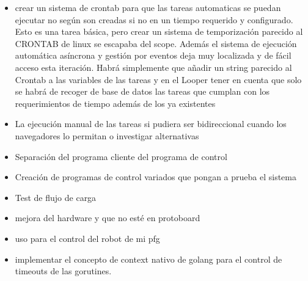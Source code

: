 \begin{itemize}
    \item crear un sistema de crontab para que las tareas automaticas se puedan ejecutar no según son creadas si no en un tiempo requerido y configurado. Esto es una tarea básica, pero crear un sistema de temporización parecido al CRONTAB de linux se escapaba del scope. Además el sistema de ejecución automática asíncrona y gestión por eventos deja muy localizada y de fácil acceso esta iteración. Habrá simplemente que añadir un string parecido al Crontab a las variables de las tareas y en el Looper tener en cuenta que solo se habrá de recoger de base de datos las tareas que cumplan con los requerimientos de tiempo además de los ya existentes
    \item La ejecución manual de las tareas si pudiera ser bidireccional cuando los navegadores lo permitan o investigar alternativas
    \item Separación del programa cliente del programa de control
    \item Creación de programas de control variados que pongan a prueba el sistema
    \item Test de flujo de carga
    \item mejora del hardware y que no esté en protoboard
    \item uso para el control del robot de mi pfg
    \item implementar el concepto de context nativo de golang para el control de timeouts de las gorutines.
\end{itemize}
